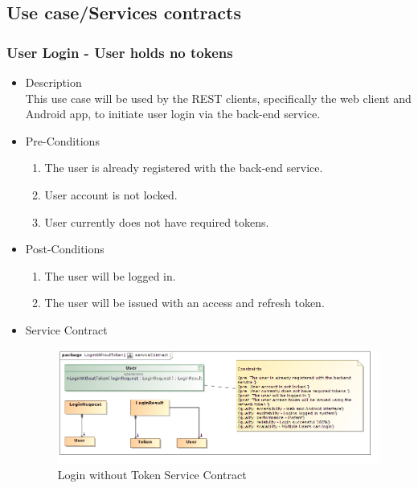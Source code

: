 \documentclass[a4paper,10pt]{article}
\begin{document}
\subsection{Use case/Services contracts}
\subsubsection{User Login - User holds no tokens}
	\begin{itemize}
		\item Description\\
		This use case will be used by the REST clients, specifically the web client and Android app, to initiate user login via the back-end service. 
		\item Pre-Conditions
			\begin{enumerate}
				\item The user is already registered with the back-end service.
				\item User account is not locked.
				\item User currently does not have required tokens.
			\end{enumerate}
		\item Post-Conditions
			\begin{enumerate}
				\item The user will be logged in.
				\item The user will be issued with an access and refresh token.			
			\end{enumerate}
		\item Service Contract
			\begin{figure}[H]
				\includegraphics[scale=0.5]{loginWithoutToken}
				\caption{Login without Token Service Contract}
			\end{figure}
	\end{itemize}
	
\end{document}
